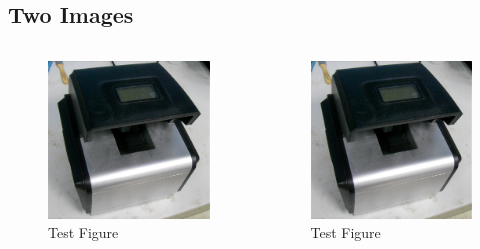 \documentclass[
        ]{beamer}
\begin{document}
\subsection{Two Images}
\begin{frame}[t]{\subsecname} %
    \begin{columns}
        \begin{figure}
        \centering
        \includegraphics[width=\textwidth]{im/testim}
        \caption{Test Figure}
        \end{figure}
        \begin{figure}
        \centering
        \includegraphics[width=\textwidth]{im/testim}
        \caption{Test Figure}
        \end{figure}
    \end{columns}
\end{frame}
\end{document}
